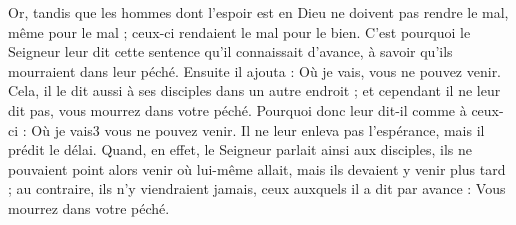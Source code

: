 Or, tandis que les hommes dont l’espoir est en Dieu ne doivent pas rendre le mal, même pour le mal ; ceux-ci rendaient le mal pour le bien. C’est pourquoi le Seigneur leur dit cette sentence qu’il connaissait d’avance, à savoir qu’ils mourraient dans leur péché. Ensuite il ajouta : Où je vais, vous ne pouvez venir. Cela, il le dit aussi à ses disciples dans un autre endroit ; et cependant il ne leur dit pas, vous mourrez dans votre péché. Pourquoi donc leur dit-il comme à ceux-ci : Où je vais3 vous ne pouvez venir. Il ne leur enleva pas l’espérance, mais il prédit le délai. Quand, en effet, le Seigneur parlait ainsi aux disciples, ils ne pouvaient point alors venir où lui-même allait, mais ils devaient y venir plus tard ; au contraire, ils n’y viendraient jamais, ceux auxquels il a dit par avance : Vous mourrez dans votre péché.

